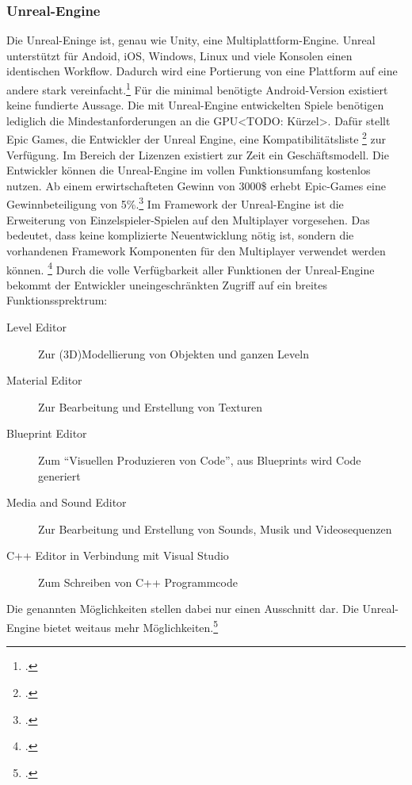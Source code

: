	\subsubsection*{Unreal-Engine}
	Die Unreal-Eninge ist, genau wie Unity, eine Multiplattform-Engine. Unreal unterstützt für Andoid, iOS, Windows, Linux und viele Konsolen einen identischen Workflow. Dadurch wird eine Portierung von eine Plattform auf eine andere stark vereinfacht.\footcite[\url{https://www.unrealengine.com/what-is-unreal-engine-4}]{unreal-home} Für die minimal benötigte Android-Version existiert keine fundierte Aussage. Die mit Unreal-Engine entwickelten Spiele benötigen lediglich die Mindestanforderungen an die GPU<TODO: Kürzel>. Dafür stellt Epic Games, die Entwickler der Unreal Engine, eine Kompatibilitätsliste \footcite[\url{https://docs.unrealengine.com/latest/INT/Platforms/Android/DeviceCompatibility/index.html}]{unreal-home} zur Verfügung. Im Bereich der Lizenzen existiert zur Zeit ein Geschäftsmodell. Die Entwickler können die Unreal-Engine im vollen Funktionsumfang kostenlos nutzen. Ab einem erwirtschafteten Gewinn von 3000\$ erhebt Epic-Games eine Gewinnbeteiligung von 5\%.\footcite[\url{https://www.unrealengine.com/custom-licensing}]{unreal-home} Im Framework der Unreal-Engine ist die Erweiterung von Einzelspieler-Spielen auf den Multiplayer vorgesehen. Das bedeutet, dass keine komplizierte Neuentwicklung nötig ist, sondern die vorhandenen Framework Komponenten für den Multiplayer verwendet werden können. \footcite[\url{https://docs.unrealengine.com/latest/INT/Gameplay/Networking/Overview/index.html}]{unreal-home} Durch die volle Verfügbarkeit aller Funktionen der Unreal-Engine bekommt der Entwickler uneingeschränkten Zugriff auf ein breites Funktionssprektrum:
	\begin{description}
		\item[Level Editor]{Zur (3D)Modellierung von Objekten und ganzen Leveln}
		\item[Material Editor]{Zur Bearbeitung und Erstellung von Texturen}
		\item[Blueprint Editor]{Zum \enquote{Visuellen Produzieren von Code}, aus Blueprints wird Code generiert}
		\item[Media and Sound Editor]{Zur Bearbeitung und Erstellung von Sounds, Musik und Videosequenzen}
		\item[C++ Editor in Verbindung mit Visual Studio]{Zum Schreiben von C++ Programmcode}
	\end{description}
	Die genannten Möglichkeiten stellen dabei nur einen Ausschnitt dar. Die Unreal-Engine bietet weitaus mehr Möglichkeiten.\footcite[https://docs.unrealengine.com/latest/INT/GettingStarted/SubEditors/]{unreal-home}

